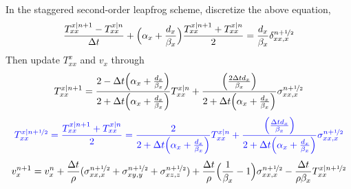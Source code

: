 In the staggered second-order leapfrog scheme, discretize the above equation,
\[ \frac{T_{xx}^{x|n+1}-T_{xx}^{x|n}}{\Delta t}+\Big(\alpha_x+\frac{d_x}{\beta_x}\Big)\frac{T_{xx}^{x|n+1}+T_{xx}^{x|n}}{2}=\frac{d_x}{\beta_x}\delta_{xx,x}^{n+\nicefrac{1}{2}} \]
Then update $T_{xx}^x$ and $v_x$ through
\[ T_{xx}^{x|n+1}=\frac{2-\Delta t\Big(\alpha_x+\frac{d_x}{\beta_x}\Big)}{2+\Delta t\Big(\alpha_x+\frac{d_x}{\beta_x}\Big)}T_{xx}^{x|n}+\frac{\Big(\frac{2\Delta td_x}{\beta_x}\Big)}{2+\Delta t\Big(\alpha_x+\frac{d_x}{\beta_x}\Big)}\sigma_{xx,x}^{n+\nicefrac{1}{2}} \]
\[ {\color{blue} T_{xx}^{x|n+\nicefrac{1}{2}}=\frac{T_{xx}^{x|n+1}+T_{xx}^{x|n}}{2}=\frac{2}{2+\Delta t\Big(\alpha_x+\frac{d_x}{\beta_x}\Big)}T_{xx}^{x|n}+\frac{\Big(\frac{\Delta td_x}{\beta_x}\Big)}{2+\Delta t\Big(\alpha_x+\frac{d_x}{\beta_x}\Big)}\sigma_{xx,x}^{n+\nicefrac{1}{2}} } \]
\[ v_x^{n+1}=v_x^n+\frac{\Delta t}{\rho}(\sigma_{xx,x}^{n+\nicefrac{1}{2}}+\sigma_{xy,y}^{n+\nicefrac{1}{2}}+\sigma_{xz,z}^{n+\nicefrac{1}{2}})+\frac{\Delta t}{\rho}\Big(\frac{1}{\beta_x}-1\Big)\sigma_{xx,x}^{n+\nicefrac{1}{2}}-\frac{\Delta t}{\rho\beta_x}T_{xx}^{x|n+\nicefrac{1}{2}} \]\par
